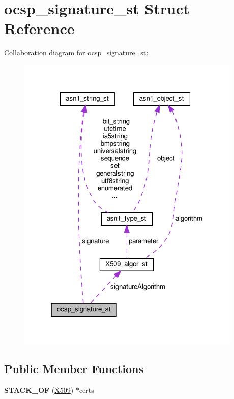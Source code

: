 \hypertarget{structocsp__signature__st}{}\section{ocsp\+\_\+signature\+\_\+st Struct Reference}
\label{structocsp__signature__st}


Collaboration diagram for ocsp\+\_\+signature\+\_\+st\+:
\nopagebreak
\begin{figure}[H]
\begin{center}
\leavevmode
\includegraphics[width=303pt]{structocsp__signature__st__coll__graph}
\end{center}
\end{figure}
\subsection*{Public Member Functions}
\begin{DoxyCompactItemize}
\item 
\mbox{\label{structocsp__signature__st_ae225db22e12419cbd84658e70d3a96e5}} 
{\bfseries S\+T\+A\+C\+K\+\_\+\+OF} (\hyperlink{structx509__st}{X509}) $\ast$certs
\end{DoxyCompactItemize}
